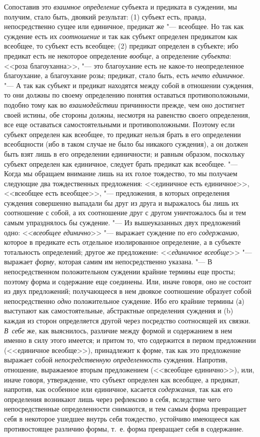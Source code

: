 Сопоставив это {\em взаимное определение}
субъекта и предиката в суждении, мы получим, стало быть,
двоякий результат: (1) субъект есть, правда, непосредственно сущее или
единичное, предикат же "--- всеобщее. Но так как суждение есть
их {\em соотношение} и
так как субъект определен предикатом как всеобщее, то субъект есть
всеобщее; (2) предикат определен в субъекте; ибо предикат есть не некоторое
определение {\em вообще},
а определение
{\em субъекта}: <<роза
благоуханна>>, "--- это благоухание есть не какое-то
неопределенное благоухание, а благоухание розы; предикат, стало быть, есть
{\em нечто единичное}. "---
А так как субъект и предикат находятся между собой в
отношении суждения, то они должны по своему определению понятия оставаться
противоположными, подобно тому как во
{\em взаимодействии}
причинности прежде, чем оно достигнет своей истины, обе
стороны должны, несмотря на равенство своего определения, все еще
оставаться самостоятельными и противоположными. Поэтому если субъект
определен как всеобщее, то предикат нельзя брать в его определении
всеобщности (ибо в таком случае не было бы никакого
суждения), а он должен быть взят лишь в его определении
единичности; и равным образом, поскольку субъект определен как единичное,
следует брать предикат как всеобщее. "--- Когда мы обращаем
внимание лишь на их голое тождество, то мы получаем следующие два
тождественных предложения:\label{bkm:bm35a}
<<единичное есть единичное>>, <<всеобщее есть всеобщее>>, "--- предложения, в
которых определения суждения совершенно выпадали бы друг из друга и
выражалось бы лишь их соотношение с собой, а их соотношение друг с другом
уничтожалось бы и тем самым упразднялось бы суждение. "--- Из
вышеуказанных двух предложений одно:
<<{\em всеобщее единично}>> "---
выражает суждение по его {\em содержанию}, которое
в предикате есть отдельное изолированное определение, а в субъекте
тотальность определений; другое же предложение:
<<{\em единичное всеобще}>> "--- выражает {\em форму},
которая самим им непосредственно указана. "---
В непосредственном положительном суждении крайние термины
еще просты; поэтому форма и содержание еще соединены. Или, иначе говоря,
оно не состоит из двух предложений; получающееся в нем двоякое соотношение
образует собой непосредственно {\em одно} положительное
суждение. Ибо его крайние термины (а) выступают как самостоятельные,
абстрактные определения суждения и (b) каждая из сторон определяется другой
через посредство соотносящей их связки. {\em В~себе} же, как
выяснилось, различие между формой и содержанием в нем именно в силу этого
имеется; и притом то, что содержится в первом предложении (<<единичное
всеобще>>), принадлежит к форме, так как это предложение выражает собой
{\em непосредственную определенность}
суждения. Напротив, отношение, выражаемое вторым предложением
(<<всеобщее единично>>), или, иначе говоря, утверждение, что субъект
определен как всеобщее, а предикат, напротив, как особенное или единичное,
касается {\em содержания},
так как его определения возникают лишь через рефлексию в
себя, вследствие чего непосредственные определенности снимаются, и тем
самым форма превращает себя в некоторое ушедшее внутрь себя тождество,
устойчиво имеющееся как противостоящее различию формы, т.~е. форма
превращает себя в содержание.

